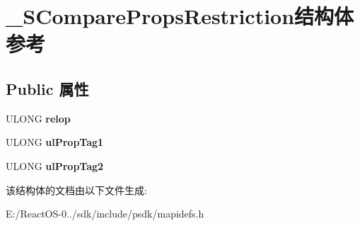 \hypertarget{struct___s_compare_props_restriction}{}\section{\+\_\+\+S\+Compare\+Props\+Restriction结构体 参考}
\label{struct___s_compare_props_restriction}
\subsection*{Public 属性}
\begin{DoxyCompactItemize}
\item 
\mbox{\label{struct___s_compare_props_restriction_a5094f3297c2f9ed89e596b924e9f404b}} 
U\+L\+O\+NG {\bfseries relop}
\item 
\mbox{\label{struct___s_compare_props_restriction_aa040a340a53a66b7d991ce7891f4b496}} 
U\+L\+O\+NG {\bfseries ul\+Prop\+Tag1}
\item 
\mbox{\label{struct___s_compare_props_restriction_a1bb0d0f67426cab9861268b2b90268c0}} 
U\+L\+O\+NG {\bfseries ul\+Prop\+Tag2}
\end{DoxyCompactItemize}


该结构体的文档由以下文件生成\+:\begin{DoxyCompactItemize}
\item 
E\+:/\+React\+O\+S-\/0../sdk/include/psdk/mapidefs.\+h\end{DoxyCompactItemize}
